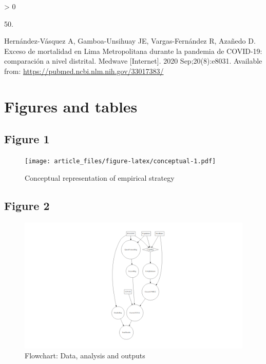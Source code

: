 \documentclass[
]{article}
\newlength{\cslhangindent}
\newlength{\csllabelwidth}
\newenvironment{CSLReferences}[2] %
 {%
  \setlength{\parindent}{0pt}
  \ifodd #1 \everypar{\setlength{\hangindent}{\cslhangindent}}\ignorespaces\fi
  \ifnum #2 > 0
  \setlength{\parskip}{#2\baselineskip}
  \fi
 }%
 {}
\newcommand{\CSLLeftMargin}[1]{\parbox[t]{\csllabelwidth}{#1}}
\newcommand{\CSLRightInline}[1]{\parbox[t]{\linewidth - \csllabelwidth}{#1}\break}
\begin{document}
\begin{CSLReferences}{0}{0}
\leavevmode\hypertarget{ref-Hernandez2020}{}%
\CSLLeftMargin{50. }
\CSLRightInline{Hernández-Vásquez A, Gamboa-Unsihuay JE, Vargas-Fernández R, Azañedo D. {Exceso de mortalidad en Lima Metropolitana durante la pandemia de COVID-19: comparaci{ó}n a nivel distrital}. Medwave {[}Internet{]}. 2020 Sep;20(8):e8031. Available from: \url{https://pubmed.ncbi.nlm.nih.gov/33017383/}}

\end{CSLReferences}

\hypertarget{figures-and-tables}{%
\section{Figures and tables}\label{figures-and-tables}}

\hypertarget{figure-1}{%
\subsection{Figure 1}\label{figure-1}}

\begin{figure}
\centering
\texttt{[image: article\_files/figure-latex/conceptual-1.pdf]}
\caption{\label{fig:conceptual}Conceptual representation of empirical strategy}
\end{figure}

\hypertarget{figure-2}{%
\subsection{Figure 2}\label{figure-2}}

\begin{figure}
\centering
\includegraphics{article_files/figure-latex/model-1.png}
\caption{\label{fig:model}Flowchart: Data, analysis and outputs}
\end{figure}
\end{document}
